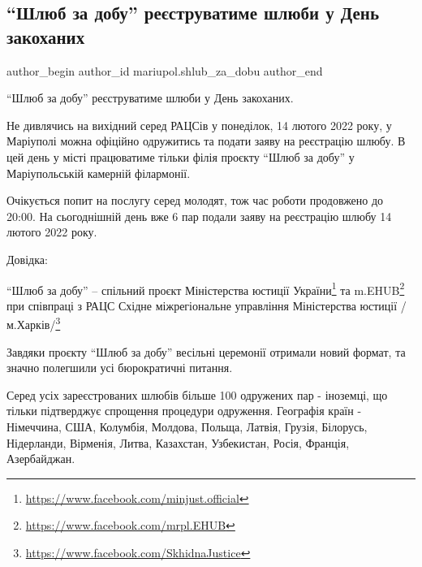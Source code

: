 
 
 
 
 

\subsection{\enquote{Шлюб за добу}  реєструватиме шлюби у День закоханих}
\label{sec:10_02_2022.fb.mariupol.shlub_za_dobu.1.reestracia_v_den_zakohanyh}

\ifcmt
 author_begin
   author_id mariupol.shlub_za_dobu
 author_end
\fi

\enquote{Шлюб за добу}  реєструватиме шлюби у День закоханих. 

Не дивлячись на вихідний серед РАЦСів у понеділок, 14 лютого 2022 року, у
Маріуполі можна офіційно одружитись та подати заяву на реєстрацію шлюбу. В цей
день у місті працюватиме тільки філія проєкту \enquote{Шлюб за добу} у Маріупольській
камерній філармонії.  

Очікується попит на послугу серед молодят, тож час роботи продовжено до 20:00.
На сьогоднішній день вже 6 пар подали заяву на реєстрацію шлюбу 14 лютого 2022
року. 

Довідка:

\enquote{Шлюб за добу} – спільний проєкт  Міністерства юстиції України\footnote{\url{https://www.facebook.com/minjust.official}} 
та m.EHUB\footnote{\url{https://www.facebook.com/mrpl.EHUB}} при
співпраці з РАЦС Східне міжрегіональне управління Міністерства юстиції
/м.Харків/\footnote{\url{https://www.facebook.com/SkhidnaJustice}}


Завдяки проєкту \enquote{Шлюб за добу} весільні церемонії отримали новий
формат, та значно полегшили усі бюрократичні питання. 

Серед усіх зареєстрованих шлюбів більше 100 одружених пар -  іноземці, що
тільки підтверджує спрощення процедури одруження. Географія країн - Німеччина,
США, Колумбія, Молдова, Польща, Латвія, Грузія, Білорусь, Нідерланди, Вірменія,
Литва, Казахстан, Узбекистан, Росія, Франція, Азербайджан.

